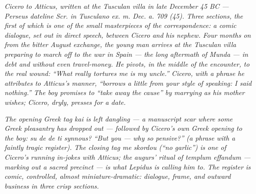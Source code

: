 
\textit{Cicero to Atticus, written at the Tusculan villa in late
December 45 BC --- Perseus dateline \textit{Scr. in Tusculano
ex. m. Dec. a. 709 (45)}. Three sections, the first of which is
one of the small masterpieces of the correspondence: a comic
dialogue, set out in direct speech, between Cicero and his
nephew. Four months on from the bitter August exchange, the
young man arrives at the Tusculan villa preparing to march off to
the war in Spain --- the long aftermath of Munda --- in debt and
without even travel-money. He pivots, in the middle of the
encounter, to the real wound: ``What really tortures me is my
uncle.'' Cicero, with a phrase he attributes to Atticus's
manner, ``borrows a little from your style of speaking: I said
nothing.'' The boy promises to ``take away the cause'' by
marrying as his mother wishes; Cicero, dryly, presses for a
date.}

\textit{The opening Greek tag \textit{kai} is left dangling --- a
manuscript scar where some Greek pleasantry has dropped out ---
followed by Cicero's own Greek opening to the boy:
\textit{su de de ti synnous?} ``But you --- why so pensive?'' (a
phrase with a faintly tragic register). The closing tag
\textit{me skordou} (``no garlic'') is one of Cicero's running
in-jokes with Atticus; the augurs' ritual of \textit{templum
effandum} --- marking out a sacred precinct --- is what Lepidus
is calling him to. The register is comic, controlled, almost
miniature-dramatic: dialogue, frame, and outward business in
three crisp sections.}
